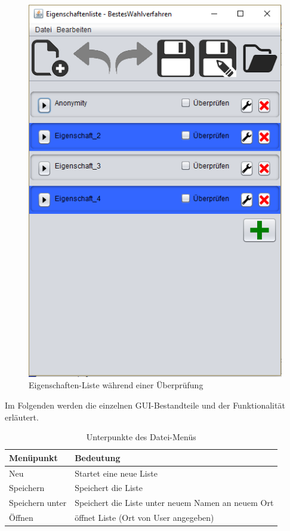 \documentclass[a4paper]{scrreprt}
\begin{document}
\begin{figure}[H]
\begin{minipage}{.5\textwidth}
  \includegraphics[scale=0.5]{Eigenschaften-Liste-waehrend-testen.png}
  \caption{Eigenschaften-Liste während einer Überprüfung}
  \label{fig:sub2}
\end{minipage}
\end{figure}

Im Folgenden werden die einzelnen \ac{GUI}-Bestandteile und der Funktionalität erläutert.

\begin{table}[H]
\begin{tabular}{|p{3cm}|p{12cm}|}
Menüpunkt & Bedeutung \\
\hline
Neu & Startet eine neue Liste \\
Speichern & Speichert die Liste \\
Speichern unter & Speichert die Liste unter neuem Namen an neuem Ort \\
Öffnen & öffnet Liste (Ort von User angegeben)
\end{tabular}
\label{Eigenschaftenliste-Datei-Menüpunkte}
\caption{Unterpunkte des Datei-Menüs}
\end{table}
\end{document}
